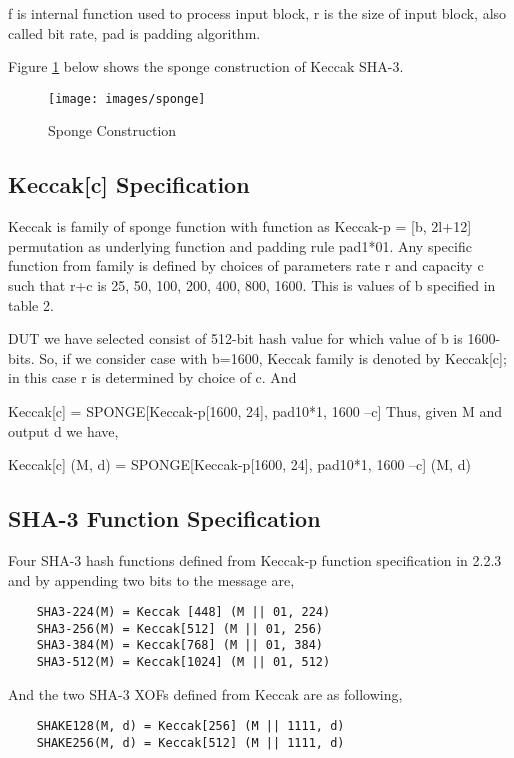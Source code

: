 f is internal function used to process input block,
r is the size of input block, also called bit rate,
pad is padding algorithm.

Figure \ref{sponge} below shows the sponge construction of Keccak SHA-3.
\begin{figure}[ht]
	\centering
	\texttt{[image: images/sponge]}
	\caption{Sponge Construction \label{sponge}}
\end{figure}


\subsection{Keccak[c] Specification}

Keccak is family of sponge function with function as Keccak-p = [b, 2l+12] permutation as underlying function and padding rule pad1*01. Any specific function from family is defined by choices of parameters rate r and capacity c such that r+c is {25, 50, 100, 200, 400, 800, 1600}. This is values of b specified in table 2.

DUT we have selected consist of 512-bit hash value for which value of b is 1600-bits. So, if we consider case with b=1600, Keccak family is denoted by Keccak[c]; in this case r is determined by choice of c. And

Keccak[c] = SPONGE[Keccak-p[1600, 24], pad10*1, 1600 –c]
Thus, given M and output d we have,

Keccak[c] (M, d) = SPONGE[Keccak-p[1600, 24], pad10*1, 1600 –c] (M, d)

\subsection{SHA-3 Function Specification}

Four SHA-3 hash functions defined from Keccak-p function specification in 2.2.3 and by appending two bits to the message are,

\vspace{0.5cm}
\begin{BVerbatim}
	SHA3-224(M) = Keccak [448] (M || 01, 224)
	SHA3-256(M) = Keccak[512] (M || 01, 256)
	SHA3-384(M) = Keccak[768] (M || 01, 384)
	SHA3-512(M) = Keccak[1024] (M || 01, 512)
\end{BVerbatim}

And the two SHA-3 XOFs defined from Keccak are as following,

\vspace{0.5cm}
\begin{BVerbatim}
	SHAKE128(M, d) = Keccak[256] (M || 1111, d)
	SHAKE256(M, d) = Keccak[512] (M || 1111, d)
\end{BVerbatim}

